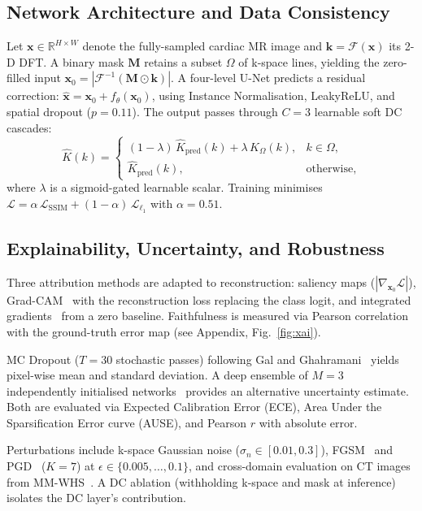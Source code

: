 \documentclass[runningheads]{llncs}
\begin{document}
\subsection{Network Architecture and Data Consistency}
Let $\mathbf{x}\!\in\!\mathbb{R}^{H\times W}$ denote the fully-sampled cardiac MR image and $\mathbf{k}=\mathcal{F}(\mathbf{x})$ its 2-D DFT. A binary mask $\mathbf{M}$ retains a subset $\Omega$ of k-space lines, yielding the zero-filled input $\mathbf{x}_0=|\mathcal{F}^{-1}(\mathbf{M}\!\odot\!\mathbf{k})|$. A four-level U-Net predicts a residual correction: $\hat{\mathbf{x}}=\mathbf{x}_0+f_\theta(\mathbf{x}_0)$, using Instance Normalisation, LeakyReLU, and spatial dropout ($p{=}0.11$). The output passes through $C{=}3$ learnable soft DC cascades:
\begin{equation}
\hat{K}(k) = \begin{cases}
(1{-}\lambda)\,\hat{K}_{\text{pred}}(k) + \lambda\, K_\Omega(k), & k\in\Omega,\\
\hat{K}_{\text{pred}}(k), & \text{otherwise,}
\end{cases}
\label{eq:dc}
\end{equation}
where $\lambda$ is a sigmoid-gated learnable scalar. Training minimises $\mathcal{L}=\alpha\,\mathcal{L}_{\text{SSIM}}+(1{-}\alpha)\,\mathcal{L}_{\ell_1}$ with $\alpha{=}0.51$.

\subsection{Explainability, Uncertainty, and Robustness}
Three attribution methods are adapted to reconstruction: saliency maps ($|\nabla_{\mathbf{x}_0}\mathcal{L}|$), Grad-CAM~\cite{selvaraju2017} with the reconstruction loss replacing the class logit, and integrated gradients~\cite{sundararajan2017} from a zero baseline. Faithfulness is measured via Pearson correlation with the ground-truth error map (see Appendix, Fig.~\ref{fig:xai}).

MC Dropout ($T{=}30$ stochastic passes) following Gal and Ghahramani~\cite{gal2016} yields pixel-wise mean and standard deviation. A deep ensemble of $M{=}3$ independently initialised networks~\cite{lakshminarayanan2017} provides an alternative uncertainty estimate. Both are evaluated via Expected Calibration Error (ECE), Area Under the Sparsification Error curve (AUSE), and Pearson $r$ with absolute error.

Perturbations include k-space Gaussian noise ($\sigma_n\!\in\![0.01,0.3]$), FGSM~\cite{goodfellow2015explaining} and PGD~\cite{madry2018towards} ($K{=}7$) at $\epsilon\!\in\!\{0.005,\ldots,0.1\}$, and cross-domain evaluation on CT images from MM-WHS~\cite{zhuang2019mmwhs}. A DC ablation (withholding k-space and mask at inference) isolates the DC layer's contribution.
\end{document}

